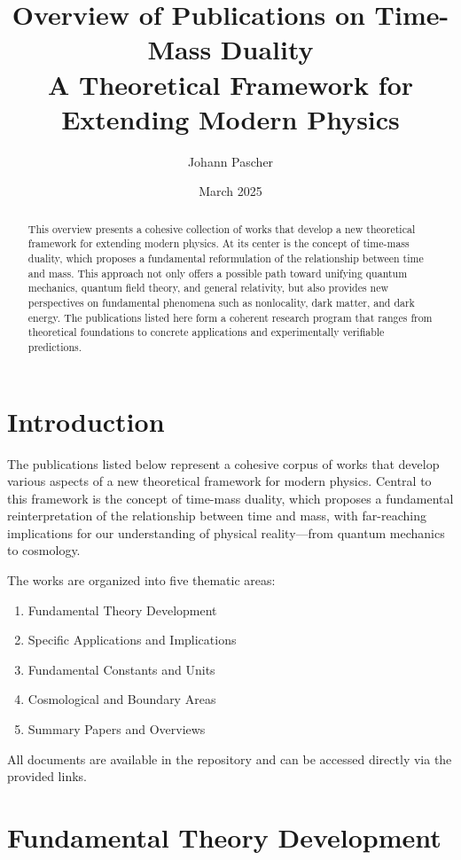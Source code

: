 \documentclass[a4paper,12pt]{article}
\title{Overview of Publications on Time-Mass Duality \\ \Large{A Theoretical Framework for Extending Modern Physics}}
\author{Johann Pascher}
\date{March 2025}
\begin{document}
	
	\maketitle
	
	\begin{abstract}
		This overview presents a cohesive collection of works that develop a new theoretical framework for extending modern physics. At its center is the concept of time-mass duality, which proposes a fundamental reformulation of the relationship between time and mass. This approach not only offers a possible path toward unifying quantum mechanics, quantum field theory, and general relativity, but also provides new perspectives on fundamental phenomena such as nonlocality, dark matter, and dark energy. The publications listed here form a coherent research program that ranges from theoretical foundations to concrete applications and experimentally verifiable predictions.
	\end{abstract}
	
	\section{Introduction}
	
	The publications listed below represent a cohesive corpus of works that develop various aspects of a new theoretical framework for modern physics. Central to this framework is the concept of time-mass duality, which proposes a fundamental reinterpretation of the relationship between time and mass, with far-reaching implications for our understanding of physical reality—from quantum mechanics to cosmology.
	
	The works are organized into five thematic areas:
	\begin{enumerate}
		\item Fundamental Theory Development
		\item Specific Applications and Implications
		\item Fundamental Constants and Units
		\item Cosmological and Boundary Areas
		\item Summary Papers and Overviews
	\end{enumerate}
	
	All documents are available in the repository and can be accessed directly via the provided links.
	
	\section{Fundamental Theory Development}
	
\end{document}

